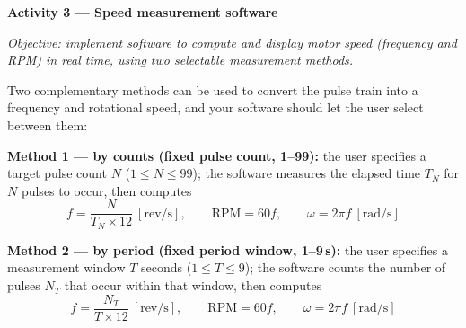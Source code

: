 \begin{procedure}
  \begin{boxedfigure}
    \centering
    \label{fig:exp7-signalpath}
  \end{boxedfigure}
  \vspace*{1.5em}

  \textbf{Activity 3 --- Speed measurement software}\vspace{2pt}

  \textit{Objective: implement software to compute and display motor speed (frequency and RPM) in real time, using two selectable measurement methods.}

  Two complementary methods can be used to convert the pulse train into a frequency and rotational speed, and your software should let the user select between them:
  \vspace*{1.5em}

  \textbf{Method 1 --- by counts (fixed pulse count, 1--99):} the user specifies a target pulse count $N$ ($1 \leq N \leq 99$); the software measures the elapsed time $T_N$ for $N$ pulses to occur, then computes
  \[
    f = \frac{N}{T_N \times 12} \ \left[\text{rev/s}\right], \qquad
    \text{RPM} = 60f, \qquad
    \omega = 2\pi f \ \left[\text{rad/s}\right]
  \]
  \vspace*{1.5em}

  \textbf{Method 2 --- by period (fixed period window, 1--9\,s):} the user specifies a measurement window $T$ seconds ($1 \leq T \leq 9$); the software counts the number of pulses $N_T$ that occur within that window, then computes
  \[
    f = \frac{N_T}{T \times 12} \ \left[\text{rev/s}\right], \qquad
    \text{RPM} = 60f, \qquad
    \omega = 2\pi f \ \left[\text{rad/s}\right]
  \]
  \newpage


\end{procedure}
